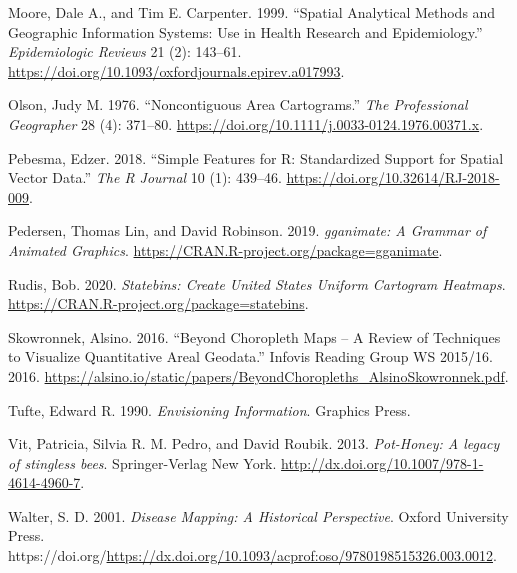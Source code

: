 \begin{CSLReferences}{1}{0}
\leavevmode{}%
Moore, Dale A., and Tim E. Carpenter. 1999. {``{Spatial Analytical Methods and Geographic Information Systems: Use in Health Research and Epidemiology}.''} \emph{Epidemiologic Reviews} 21 (2): 143--61. \url{https://doi.org/10.1093/oxfordjournals.epirev.a017993}.

\leavevmode{}%
Olson, Judy M. 1976. {``{Noncontiguous Area Cartograms}.''} \emph{The Professional Geographer} 28 (4): 371--80. \url{https://doi.org/10.1111/j.0033-0124.1976.00371.x}.

\leavevmode{}%
Pebesma, Edzer. 2018. {``{Simple Features for R: Standardized Support for Spatial Vector Data}.''} \emph{{The R Journal}} 10 (1): 439--46. \url{https://doi.org/10.32614/RJ-2018-009}.

\leavevmode{}%
Pedersen, Thomas Lin, and David Robinson. 2019. \emph{{gganimate: A Grammar of Animated Graphics}}. \url{https://CRAN.R-project.org/package=gganimate}.

\leavevmode{}%
Rudis, Bob. 2020. \emph{Statebins: Create United States Uniform Cartogram Heatmaps}. \url{https://CRAN.R-project.org/package=statebins}.

\leavevmode{}%
Skowronnek, Alsino. 2016. {``{Beyond Choropleth Maps -- A Review of Techniques to Visualize Quantitative Areal Geodata}.''} {Infovis Reading Group WS 2015/16}. 2016. \url{https://alsino.io/static/papers/BeyondChoropleths_AlsinoSkowronnek.pdf}.

\leavevmode{}%
Tufte, Edward R. 1990. \emph{Envisioning Information}. Graphics Press.

\leavevmode{}%
Vit, Patricia, Silvia R. M. Pedro, and David Roubik. 2013. \emph{{Pot-Honey: A legacy of stingless bees}}. Springer-Verlag New York. \url{http://dx.doi.org/10.1007/978-1-4614-4960-7}.

\leavevmode{}%
Walter, S. D. 2001. \emph{{Disease Mapping: A Historical Perspective}}. Oxford University Press. https://doi.org/\url{https://dx.doi.org/10.1093/acprof:oso/9780198515326.003.0012}.

\end{CSLReferences}



\address{%
Stephanie Kobakian\\
\\%
Sydney, Australia\\
%
%
%
\href{mailto:stephanie.kobakian@gmail.com}{\nolinkurl{stephanie.kobakian@gmail.com}}%
}

